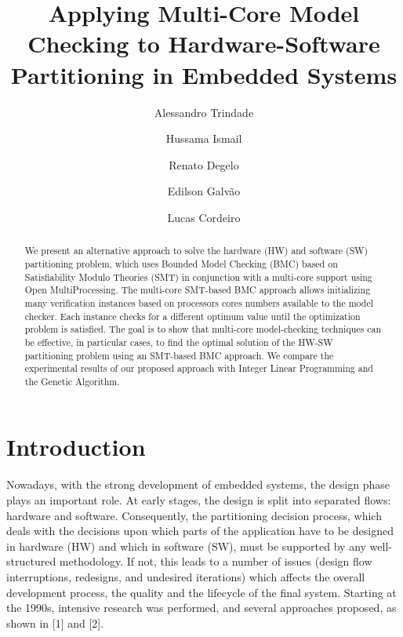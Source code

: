\title{Applying Multi-Core Model Checking to Hardware-Software Partitioning in Embedded Systems}
\author{Alessandro Trindade\and Hussama Ismail\and Renato Degelo\and Edilson Galv\~ao\and Lucas Cordeiro}
\maketitle

\begin{abstract}
We present an alternative approach to solve the hardware (HW) and software (SW) partitioning problem, which uses Bounded Model Checking (BMC) based on Satisfiability Modulo Theories (SMT) in conjunction with a multi-core support using Open MultiProcessing. The multi-core SMT-based BMC approach allows initializing many verification instances based on processors cores numbers available to the model checker. Each instance checks for a different optimum value until the optimization problem is satisfied. The goal is to show that multi-core model-checking techniques can be effective, in particular cases, to find the optimal solution of the HW-SW partitioning problem using an SMT-based BMC approach. We compare the experimental results of our proposed approach with Integer Linear Programming and the Genetic Algorithm.
\end{abstract}

\section{Introduction}
Nowadays, with the strong development of embedded systems, the design phase plays an important role. At early stages, the design is split into separated flows: hardware and software. Consequently, the partitioning decision process, which deals with the decisions upon which parts of the application have to be designed in hardware (HW) and which in software (SW), must be supported by any well-structured methodology. If not, this leads to a number of issues (design flow interruptions, redesigns, and undesired iterations) which affects the overall development process, the quality and the lifecycle of the final system. Starting at the 1990s, intensive research was performed, and several approaches proposed, as shown in [1] and [2].

